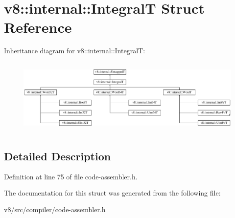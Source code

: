 \hypertarget{structv8_1_1internal_1_1IntegralT}{}\section{v8\+:\+:internal\+:\+:IntegralT Struct Reference}
\label{structv8_1_1internal_1_1IntegralT}
Inheritance diagram for v8\+:\+:internal\+:\+:IntegralT\+:\begin{figure}[H]
\begin{center}
\leavevmode
\includegraphics[height=3.783784cm]{structv8_1_1internal_1_1IntegralT}
\end{center}
\end{figure}


\subsection{Detailed Description}


Definition at line 75 of file code-\/assembler.\+h.



The documentation for this struct was generated from the following file\+:\begin{DoxyCompactItemize}
\item 
v8/src/compiler/code-\/assembler.\+h\end{DoxyCompactItemize}
